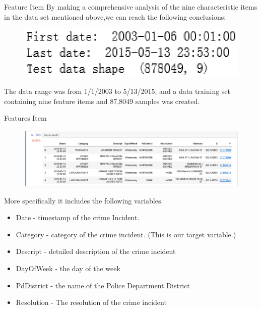 \documentclass[
 size=14pt,
 paper=smartboard,  %
 mode=present, 		%
 display=slides, 	%
 style=tuliplab,  	%
 pauseslide,
 fleqn,leqno]{powerdot}
\begin{document}
\begin{slide}{Feature Item}
By making a comprehensive analysis of the nine
characteristic items in the data set mentioned 
above,we can reach the following conclusions:


\bigskip

\begin{figure}[htbp]
  \centering
  \includegraphics[width=1\textwidth]{kaggle/1.eps}
  \caption{}
\end{figure}
\setlength{\parindent}{2em}The data range was from 1/1/2003 to 5/13/2015, and 
a data training set containing nine feature items and 87,8049 
samples was created.
\end{slide}

\begin{slide}{Features Item}
  \begin{figure}
    \centering
    \includegraphics[width=1\textwidth]{kaggle/2.eps}
  \end{figure}
  
  \bigskip
More specifically it includes the following variables.
  \begin{itemize}
    \item Date - timestamp of the crime Incident.
    \item Category - category of the crime incident. (This is our target variable.)
    \item Descript - detailed description of the crime incident
    \item DayOfWeek - the day of the week
    \item PdDistrict - the name of the Police Department District
    \item Resolution - The resolution of the crime incident

  \end{itemize}
\end{slide}
\end{document}
